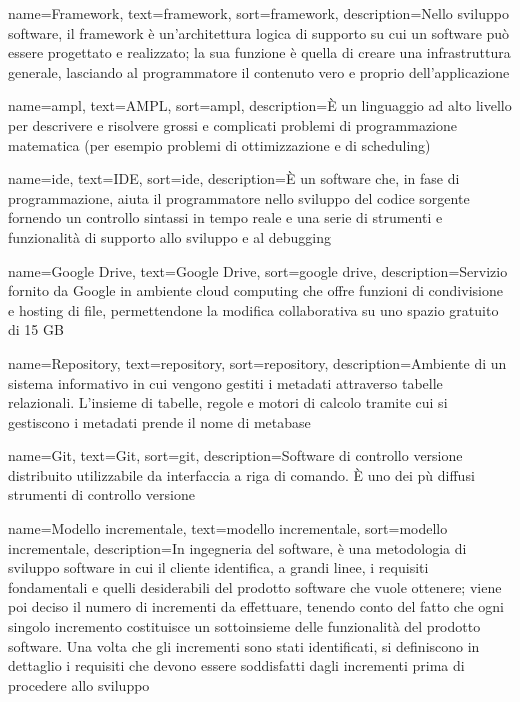 {
    name=Framework,
    text=framework,
    sort=framework,
    description={Nello sviluppo software, il framework è un'architettura logica di supporto su cui un software può essere progettato e realizzato; la sua funzione è quella di creare una infrastruttura generale, lasciando al programmatore il contenuto vero e proprio dell'applicazione}
}

{
    name=\gls{ampl},
    text=AMPL,
    sort=ampl,
    description={È un linguaggio ad alto livello per descrivere e risolvere grossi e complicati problemi di programmazione matematica (per esempio problemi di ottimizzazione e di scheduling)}
}

{
    name=\gls{ide},
    text=IDE,
    sort=ide,
    description={È un software che, in fase di programmazione, aiuta il programmatore nello sviluppo del codice sorgente fornendo un controllo sintassi in tempo reale e una serie di strumenti e funzionalità di supporto allo sviluppo e al debugging}
}

{
    name=Google Drive,
    text=Google Drive,
    sort=google drive,
    description={Servizio fornito da Google in ambiente cloud computing che offre funzioni di condivisione e hosting di file, permettendone la modifica collaborativa su uno spazio gratuito di 15 GB}
}

{
    name=Repository,
    text=repository,
    sort=repository,
    description={Ambiente di un sistema informativo in cui vengono gestiti i metadati attraverso tabelle relazionali. L'insieme di tabelle, regole e motori di calcolo tramite cui si gestiscono i metadati prende il nome di metabase}
}

{
    name=Git,
    text=Git,
    sort=git,
    description={Software di controllo versione distribuito utilizzabile da interfaccia a riga di comando. È uno dei pù diffusi strumenti di controllo versione}
}

{
    name=Modello incrementale,
    text=modello incrementale,
    sort=modello incrementale,
    description={In ingegneria del software, è una metodologia di sviluppo software in cui il cliente identifica, a grandi linee, i requisiti fondamentali e quelli desiderabili del prodotto software che vuole ottenere; viene poi deciso il numero di incrementi da effettuare, tenendo conto del fatto che ogni singolo incremento costituisce un sottoinsieme delle funzionalità del prodotto software. Una volta che gli incrementi sono stati identificati, si definiscono in dettaglio i requisiti che devono essere soddisfatti dagli incrementi prima di procedere allo sviluppo}
}

